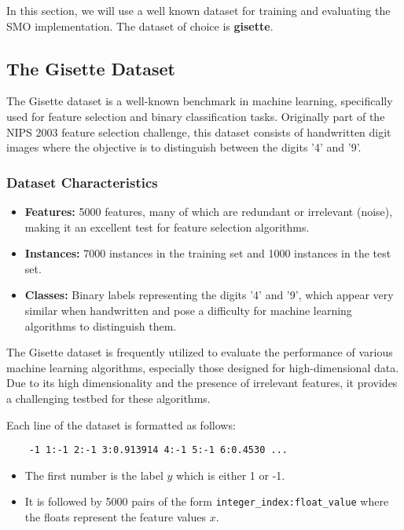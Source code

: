 \documentclass[10pt,a4paper]{article}
\begin{document}
In this section, we will use a well known dataset for training and evaluating the SMO implementation. The dataset of choice is \textbf{gisette}.


\subsection{The Gisette Dataset}

The Gisette dataset is a well-known benchmark in machine learning, specifically used for feature selection and binary classification tasks. Originally part of the NIPS 2003 feature selection challenge, this dataset consists of handwritten digit images where the objective is to distinguish between the digits '4' and '9'.

\subsubsection{Dataset Characteristics}

\begin{itemize}
	\item \textbf{Features:} 5000 features, many of which are redundant or irrelevant (noise), making it an excellent test for feature selection algorithms.
	\item \textbf{Instances:} 7000 instances in the training set and 1000 instances in the test set.
	\item \textbf{Classes:} Binary labels representing the digits '4' and '9', which appear very similar when handwritten and pose a difficulty for machine learning algorithms to distinguish them.
\end{itemize}

The Gisette dataset is frequently utilized to evaluate the performance of various machine learning algorithms, especially those designed for high-dimensional data. Due to its high dimensionality and the presence of irrelevant features, it provides a challenging testbed for these algorithms.

Each line of the dataset is formatted as follows:
\begin{verbatim}
	-1 1:-1 2:-1 3:0.913914 4:-1 5:-1 6:0.4530 ...
\end{verbatim}
\begin{itemize}
	\item The first number is the label \( y \) which is either 1 or -1.
	\item It is followed by 5000 pairs of the form \texttt{integer\_index:float\_value} where the floats represent the feature values \( x \).
\end{itemize}
\end{document}
